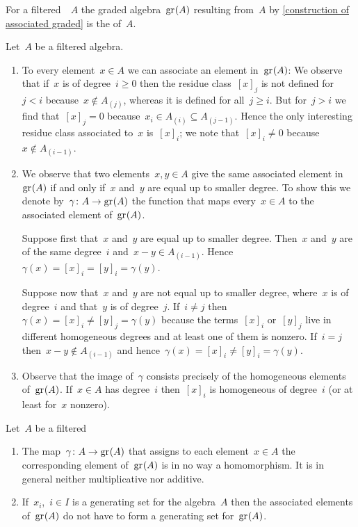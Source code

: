 \begin{definition}
  For a filtered~{\algebra{$\kf$}}~$A$ the graded algebra~$\gr(A)$ resulting from~$A$ by \cref{construction of associated graded} is the  of~$A$.
\end{definition}


\begin{remark}
  Let~$A$ be a filtered algebra.
  \begin{enumerate}
    \item
      To every element~$x \in A$ we can associate an element in~$\gr(A)$:
      We observe that if~$x$ is of degree~$i \geq 0$ then the residue class~$[x]_j$ is not defined for~$j < i$ because~$x \notin A_{(j)}$, whereas it is defined for all~$j \geq i$.
      But for~$j > i$ we find that~$[x]_j = 0$ because~$x_i \in A_{(i)} \subseteq A_{(j-1)}$.
      Hence the only interesting residue class associated to~$x$ is~$[x]_i$;
      we note that~$[x]_i \neq 0$ because~$x \notin A_{(i-1)}$.
    \item
      We observe that two elements~$x, y \in A$ give the same associated element in~$\gr(A)$ if and only if~$x$ and~$y$ are equal up to smaller degree.
      To show this we denote by~$\gamma \colon A \to \gr(A)$ the function that maps every~$x \in A$ to the associated element of~$\gr(A)$.
      
      Suppose first that~$x$ and~$y$ are equal up to smaller degree.
      Then~$x$ and~$y$ are of the same degree~$i$ and~$x - y \in A_{(i-1)}$.
      Hence~$\gamma(x) = [x]_i = [y]_i = \gamma(y)$.
      
      Suppose now that~$x$ and~$y$ are not equal up to smaller degree, where~$x$ is of degree~$i$ and that~$y$ is of degree~$j$.
      If~$i \neq j$ then~$\gamma(x) = [x]_i \neq [y]_j = \gamma(y)$ because the terms~$[x]_i$ or~$[y]_j$ live in different homogeneous degrees and at least one of them is nonzero.
      If~$i = j$ then~$x - y \notin A_{(i-1)}$ and hence~$\gamma(x) = [x]_i \neq [y]_i = \gamma(y)$.
    \item
      Observe that the image of~$\gamma$ consists precisely of the homogeneous elements of~$\gr(A)$.
      If~$x \in A$ has degree~$i$ then~$[x]_i$ is homogeneous of degree~$i$ (or at least for~$x$ nonzero).
  \end{enumerate}
\end{remark}


\begin{warning}
  Let~$A$ be a filtered~{\algebra{$\kf$}}
  \begin{enumerate}
    \item
      The map~$\gamma \colon A \to \gr(A)$ that assigns to each element~$x \in A$ the corresponding element of~$\gr(A)$ is in no way a homomorphism.
      It is in general neither multiplicative nor additive.
    \item
      If~$x_i$,~$i \in I$ is a generating set for the algebra~$A$ then the associated elements of~$\gr(A)$ do not have to form a generating set for~$\gr(A)$.
  \end{enumerate}
\end{warning}


